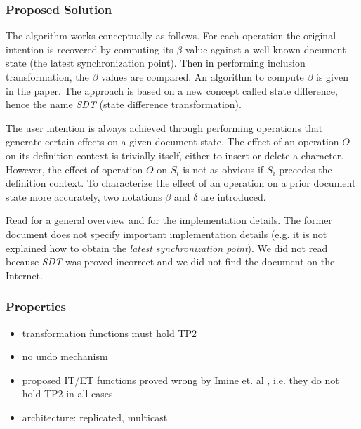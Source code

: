 \subsubsection{Proposed Solution}
The algorithm works conceptually as follows. For each operation the original intention is recovered by computing its $\beta$ value against a well-known document state (the latest synchronization point). Then in performing inclusion transformation, the $\beta$ values are compared. An algorithm to compute $\beta$ is given in the paper. The approach is based on a new concept called state difference, hence the name \emph{SDT} (state difference transformation).

The user intention is always achieved through performing operations that generate certain effects on a given document state. The effect of an operation $O$ on its definition context is trivially itself, either to insert or delete a character. However, the effect of operation $O$ on $S_{i}$ is not as obvious if $S_{i}$ precedes the definition context. To characterize the effect of an operation on a prior document state more accurately, two notations $\beta$ and $\delta$ are introduced.

Read \cite{sdt} for a general overview and \cite{li03} for the implementation details. The former document does not specify important implementation details (e.g. it is not explained how to obtain the \emph{latest synchronization point}). We did not read \cite{li03} because \emph{SDT} was proved incorrect \cite{imine04} and we did not find the document on the Internet.

\subsubsection{Properties}
\begin{itemize}
 \item transformation functions must hold TP2
 \item no undo mechanism
 \item proposed IT/ET functions proved wrong by Imine et. al \cite{imine04}, 
       i.e. they do not hold TP2 in all cases
 \item architecture: replicated, multicast
\end{itemize}



